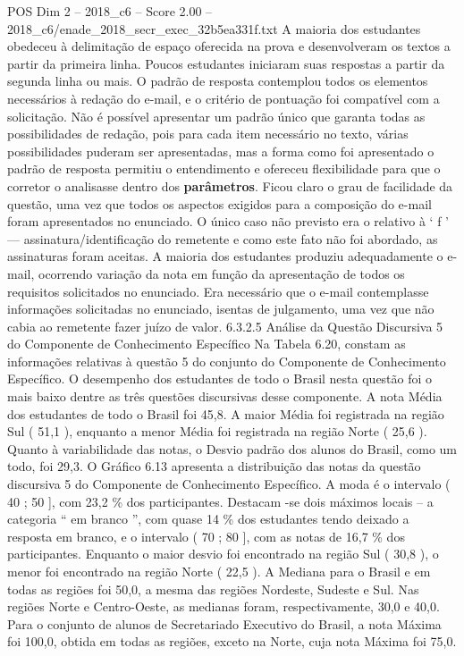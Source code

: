 \begin{textsample}{POS Dim 2 – 2018\_c6 – Score 2.00 – 2018\_c6/enade\_2018\_secr\_exec\_32b5ea331f.txt}
A maioria dos estudantes obedeceu à delimitação de espaço oferecida na prova e desenvolveram os textos a partir da primeira linha.
Poucos estudantes iniciaram suas respostas a partir da segunda linha ou mais.
O padrão de resposta contemplou todos os elementos necessários à redação do e-mail, e o critério de pontuação foi compatível com a solicitação.
Não é possível apresentar um padrão único que garanta todas as possibilidades de redação, pois para cada item necessário no texto, várias possibilidades puderam ser apresentadas, mas a forma como foi apresentado o padrão de resposta permitiu o entendimento e ofereceu flexibilidade para que o corretor o analisasse dentro dos \textbf{parâmetros}.
Ficou claro o grau de facilidade da questão, uma vez que todos os aspectos exigidos para a composição do e-mail foram apresentados no enunciado.
O único caso não previsto era o relativo à ‘ f ’ — assinatura/identificação do remetente e como este fato não foi abordado, as assinaturas foram aceitas.
A maioria dos estudantes produziu adequadamente o e-mail, ocorrendo variação da nota em função da apresentação de todos os requisitos solicitados no enunciado.
Era necessário que o e-mail contemplasse informações solicitadas no enunciado, isentas de julgamento, uma vez que não cabia ao remetente fazer juízo de valor. 6.3.2.5 Análise da Questão Discursiva 5 do Componente de Conhecimento Específico Na Tabela 6.20, constam as informações relativas à questão 5 do conjunto do Componente de Conhecimento Específico.
O desempenho dos estudantes de todo o Brasil nesta questão foi o mais baixo dentre as três questões discursivas desse componente.
A nota Média dos estudantes de todo o Brasil foi 45,8.
A maior Média foi registrada na região Sul ( 51,1 ), enquanto a menor Média foi registrada na região Norte ( 25,6 ).
Quanto à variabilidade das notas, o Desvio padrão dos alunos do Brasil, como um todo, foi 29,3.
O Gráfico 6.13 apresenta a distribuição das notas da questão discursiva 5 do Componente de Conhecimento Específico.
A moda é o intervalo ( 40 ; 50 ], com 23,2 \% dos participantes.
Destacam -se dois máximos locais – a categoria “ em branco ”, com quase 14 \% dos estudantes tendo deixado a resposta em branco, e o intervalo ( 70 ; 80 ], com as notas de 16,7 \% dos participantes.
Enquanto o maior desvio foi encontrado na região Sul ( 30,8 ), o menor foi encontrado na região Norte ( 22,5 ).
A Mediana para o Brasil e em todas as regiões foi 50,0, a mesma das regiões Nordeste, Sudeste e Sul.
Nas regiões Norte e Centro-Oeste, as medianas foram, respectivamente, 30,0 e 40,0.
Para o conjunto de alunos de Secretariado Executivo do Brasil, a nota Máxima foi 100,0, obtida em todas as regiões, exceto na Norte, cuja nota Máxima foi 75,0.

\end{textsample}
